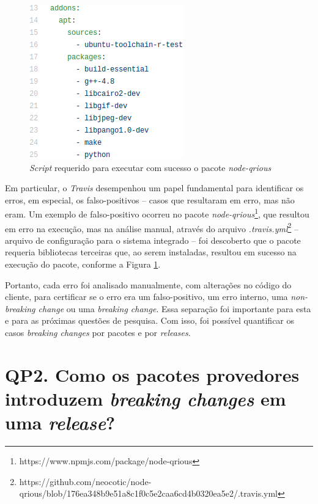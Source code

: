\begin{itemize}
    \begin{figure}
        \centering
        \includegraphics[scale=0.6]{figuras/false_positive.png}
        \caption{\textit{Script} requerido para executar com sucesso o pacote \textit{node-qrious}}
        \label{fig:false-positive}
    \end{figure}{}

    Em particular, o \textit{Travis} desempenhou um papel fundamental para identificar os erros, em especial, os falso-positivos -- casos que resultaram em erro, mas não eram. Um exemplo de falso-positivo ocorreu no pacote \textit{node-qrious}\footnote{https://www.npmjs.com/package/node-qrious}, que resultou em erro na execução, mas na análise manual, através do arquivo \textit{.travis.yml}\footnote{https://github.com/neocotic/node-qrious/blob/176ea348b9e51a8c1f0c5e2caa6cd4b0320ea5e2/.travis.yml} -- arquivo de configuração para o sistema integrado -- foi descoberto que o pacote requeria bibliotecas terceiras que, ao serem instaladas, resultou em sucesso na execução do pacote, conforme a Figura \ref{fig:false-positive}.
\end{itemize}{}

Portanto, cada erro foi analisado manualmente, com alterações no código do cliente, para certificar se o erro era um falso-positivo, um erro interno, uma \textit{non-breaking change} ou uma \textit{breaking change}. Essa separação foi importante para esta e para as próximas questões de pesquisa. Com isso, foi possível quantificar os casos \textit{breaking changes} por pacotes e por \textit{releases}.


\section{QP2. Como os pacotes provedores introduzem \textit{breaking changes} em uma \textit{release}?}
\label{sec:qp2}

